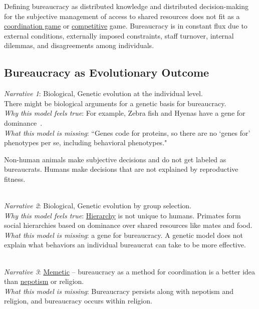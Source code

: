 Defining bureaucracy as distributed knowledge and distributed decision-making for the subjective management of access to shared resources does not fit as a \href{https://en.wikipedia.org/wiki/Coordination_game}{coordination game} 
or \href{https://en.wikipedia.org/wiki/Non-cooperative_game_theory}{competitive} game. 
Bureaucracy is in constant flux due to external conditions, externally imposed constraints, staff turnover, internal dilemmas, and disagreements among individuals. 

\subsection*{Bureaucracy as Evolutionary Outcome}

\textit{Narrative 1}: Biological, Genetic evolution at the individual level. \\
There might be biological arguments for a genetic basis for bureaucracy. \\
\textit{Why this model feels true}: For example, Zebra fish and Hyenas have a gene for dominance~\cite{2012_Holekamp}. \\
\textit{What this model is missing}: ``Genes code for proteins, so there are no `genes for' phenotypes per se, including behavioral phenotypes."~\cite{2015_Lilienfeld}

Non-human animals make subjective decisions and do not get labeled as bureaucrats. Humans make decisions that are not explained by reproductive fitness.

\ \\
\textit{Narrative 2}: Biological, Genetic evolution by group selection. \\
\textit{Why this model feels true}: \hyperref[sec:hierarchy-of-roles]{Hierarchy}
is not unique to humans. Primates form  social hierarchies based on dominance over shared resources like mates and food. \\
\textit{What this model is missing}: a gene for bureaucracy. A genetic model does not explain what behaviors an individual bureaucrat can take to be more effective. 

\ \\
\textit{Narrative 3}: \href{https://en.wikipedia.org/wiki/Memetics}{Memetic}
-- bureaucracy as a method for coordination is a better idea than \href{https://en.wikipedia.org/wiki/Nepotism}{nepotism} 
or religion. \\
\textit{What this model is missing}: Bureaucracy persists along with nepotism and religion, and bureaucracy occurs within religion. 

